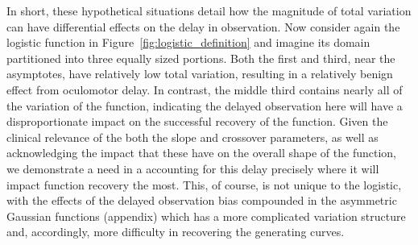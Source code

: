 \documentclass{article}
\begin{document}
In short, these hypothetical situations detail how the magnitude of total variation can have differential effects on the delay in observation. Now consider again the logistic function in Figure~\ref{fig:logistic_definition} and imagine its domain partitioned into three equally sized portions. Both the first and third, near the asymptotes, have relatively low total variation, resulting in a relatively benign effect from oculomotor delay. In contrast, the middle third contains nearly all of the variation of the function, indicating the delayed observation here will have a disproportionate impact on the successful recovery of the function. Given the clinical relevance of the both the slope and crossover parameters, as well as acknowledging the impact that these have on the overall shape of the function, we demonstrate a need in a accounting for this delay precisely where it will impact function recovery the most. This, of course, is not unique to the logistic, with the effects of the delayed observation bias compounded in the asymmetric Gaussian functions (appendix) which has a more complicated variation structure and, accordingly, more difficulty in recovering the generating curves.



\end{document}

